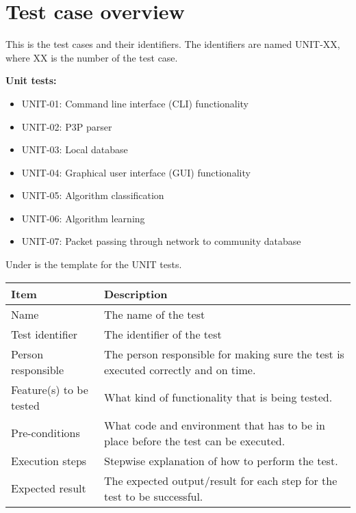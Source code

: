 	\section{Test case overview}
		This is the test cases and their identifiers. The identifiers are named UNIT-XX, where XX is the number of the test case.
		\vspace{8 mm}
		
		\textbf{Unit tests:}
		\begin{itemize}
			\renewcommand{\labelitemi}{$\bullet$}
				\item UNIT-01: Command line interface (CLI) functionality
				\item UNIT-02: P3P parser
				\item UNIT-03: Local database
				\item UNIT-04: Graphical user interface (GUI) functionality
				\item UNIT-05: Algorithm classification
				\item UNIT-06: Algorithm learning
				\item UNIT-07: Packet passing through network to community database
		\end{itemize}

		Under is the template for the UNIT tests.
		\begin{center}
			\begin{tabular}{ |  p{4cm} | p{10cm} | }
				\hline
				Item & Description \\ [3pt] \hline \hline
				Name & The name of the test \\  [3pt] \hline
				Test identifier & The identifier of the test \\  [3pt] \hline
				Person responsible & The person responsible for making sure the test is executed correctly and on time. \\  [3pt] \hline
				Feature(s) to be tested & What kind of functionality that is being tested. \\  [3pt] \hline
				Pre-conditions & What code and environment that has to be in place before the test can be executed. \\  [3pt] \hline
				Execution steps & Stepwise explanation of how to perform the test. \\  [3pt] \hline
				Expected result & The expected output/result for each step for the test to be successful. \\  [3pt] \hline
			\end{tabular}
		\end{center}

